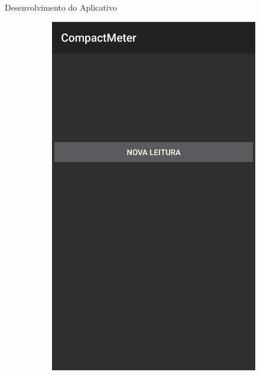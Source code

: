 \documentclass[12pt]{beamer}
\begin{document}
\begin{frame}{Desenvolvimento do Aplicativo}
    \begin{figure}
    \centering
        \begin{subfigure}[t]{0.3\textwidth}
        \includegraphics[width=\textwidth]{Main.png}
        \label{fig:RequestEnable}
        \end{subfigure}
        ~
        \begin{subfigure}[t]{0.3\textwidth}

\end{subfigure}
\end{figure}
\end{frame}
\end{document}
